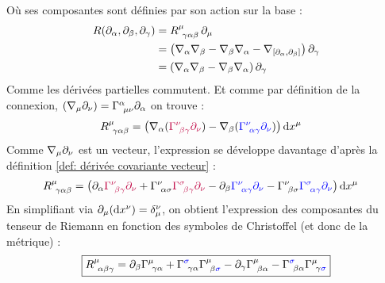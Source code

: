 Où ses composantes sont définies par son action sur la base :
\begin{align}
     R(\partial_{\alpha}, \partial_{\beta},\partial_{\gamma}) &= R\indices{^{\mu}_{\!\gamma \alpha \beta}} \,\pd_\mu\\
     & =\lt \nabla_{\alpha} \nabla_{\beta}  - \nabla_{\beta}\nabla_{\alpha} - \nabla_{[\partial_{\alpha}, \partial_{\beta}]}\rt\partial_{\gamma}\\
     & = \lt \nabla_{\alpha} \nabla_{\beta}  - \nabla_{\beta}\nabla_{\alpha}\rt\partial_{\gamma}
\end{align}
Comme les dérivées partielles commutent. Et comme par définition de la connexion, $(\nabla_\mu \partial_\nu) = \Gamma\indices{^\alpha_{\!\mu\nu}} \pd_\alpha$ on trouve :
\begin{align}
     R\indices{^{\mu}_{\!\gamma\alpha \beta}} &=\lt \nabla_{{\alpha}}(\textcolor{purple}{\Gamma\indices{^{\nu}_{\!\beta \gamma}}\partial_{\nu}}) - \nabla_{{\beta}}(\textcolor{blue}{\Gamma\indices{^{\nu}_{\!\alpha \gamma}}\partial_{\nu}}) \rt \td x^{\mu}
\end{align}
Comme $\nabla_\mu \partial_\nu$ est un vecteur, l'expression se développe davantage d'après la définition \ref{def: dérivée covariante vecteur} :
\begin{align}
     R\indices{^{\mu}_{\!\gamma\alpha \beta}} &=\lt \partial_{\alpha}\textcolor{purple}{\Gamma\indices{^{\nu}_{\!\beta \gamma}}\partial_{\nu}} + \Gamma\indices{^{\nu}_{\!\alpha \sigma}}\textcolor{purple}{\Gamma\indices{^{\sigma}_{\!\beta \gamma}}} \textcolor{purple}{\partial_{\nu}} - \partial_{\beta}\textcolor{blue}{\Gamma\indices{^{\nu}_{\!\alpha \gamma}}\partial_{\nu}} - \Gamma\indices{^{\nu}_{\!\beta \sigma}}\textcolor{blue}{\Gamma\indices{^{\sigma}_{\!\alpha \gamma}}} \textcolor{blue}{\partial_{\nu}} \rt \td x^{\mu}
\end{align}
En simplifiant via $\partial_\mu (\mathrm{d} x^\nu) = \delta^\nu_\mu$, on obtient l'expression des composantes du tenseur de Riemann en fonction des symboles de Christoffel (et donc de la métrique) :
\begin{align}
     \label{Composantes du tenseur de Riemann}
    \boxed{R\indices{^{\mu}_{\!\alpha \beta \gamma}} =  \partial_{\beta}\Gamma\indices{^{\mu}_{\!\gamma \alpha}} + \Gamma\indices{^{\blue{\sigma}}_{\!\gamma \alpha}} \Gamma\indices{^{\mu}_{\!\beta \blue{\sigma}}} - \partial_{\gamma}\Gamma\indices{^{\mu}_{\!\beta \alpha}} - \Gamma\indices{^{\blue{\sigma}}_{\!\beta \alpha}} \Gamma\indices{^{\mu}_{\!\gamma \blue{\sigma}}} }
\end{align}
